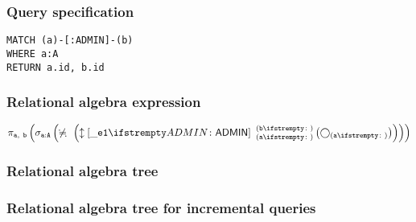 \subsubsection*{Query specification}

\begin{lstlisting}
MATCH (a)-[:ADMIN]-(b)
WHERE a:A
RETURN a.id, b.id
\end{lstlisting}

\subsubsection*{Relational algebra expression}

$\projection{\var{a},~\var{b}} \left(\selection{\mathtt{a:A}} \left(\alldifferent{} \left(\expandboth{\_e1}{ADMIN}{a}{b}{} \left(\getvertices{a}{}\right)\right)\right)\right)$

\subsubsection*{Relational algebra tree}


\subsubsection*{Relational algebra tree for incremental queries}


